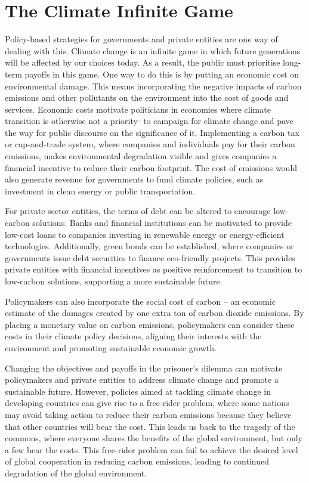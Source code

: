 \documentclass[11pt,a4paper]{article}
\begin{document}
\section*{The Climate Infinite Game}
Policy-based strategies for governments and private entities are one way of dealing with this. Climate change is an infinite game in which future generations will be affected by our choices today. As a result, the public must prioritise long-term payoffs in this game. One way to do this is by putting an economic cost on environmental damage. This means incorporating the negative impacts of carbon emissions and other pollutants on the environment into the cost of goods and services. Economic costs motivate politicians in economies where climate transition is otherwise not a priority- to campaign for climate change and pave the way for public discourse on the significance of it. Implementing a carbon tax or cap-and-trade system, where companies and individuals pay for their carbon emissions, makes environmental degradation visible and gives companies a financial incentive to reduce their carbon footprint. The cost of emissions would also generate revenue for governments to fund climate policies, such as investment in clean energy or public transportation. \par
For private sector entities, the terms of debt can be altered to encourage low-carbon solutions. Banks and financial institutions can be motivated to provide low-cost loans to companies investing in renewable energy or energy-efficient technologies. Additionally, green bonds can be established, where companies or governments issue debt securities to finance eco-friendly projects. This provides private entities with financial incentives as positive reinforcement to transition to low-carbon solutions, supporting a more sustainable future.   \par
Policymakers can also incorporate the social cost of carbon – an economic estimate of the damages created by one extra ton of carbon dioxide emissions. By placing a monetary value on carbon emissions, policymakers can consider these costs in their climate policy decisions, aligning their interests with the environment and promoting sustainable economic growth.  \par
Changing the objectives and payoffs in the prisoner's dilemma can motivate policymakers and private entities to address climate change and promote a sustainable future. However, policies aimed at tackling climate change in developing countries can give rise to a free-rider problem, where some nations may avoid taking action to reduce their carbon emissions because they believe that other countries will bear the cost. This leads us back to the tragedy of the commons, where everyone shares the benefits of the global environment, but only a few bear the costs. This free-rider problem can fail to achieve the desired level of global cooperation in reducing carbon emissions, leading to continued degradation of the global environment.  \par
\end{document}
